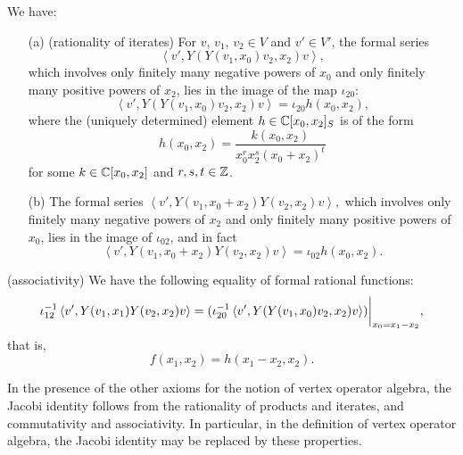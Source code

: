 \documentclass[12pt]{article}
\begin{document}
\begin{propo}\label{rationalityofiterates}
We have:
\begin{enumerate}
\item[(a)] (rationality of iterates) For $v$, $v_{1}$, $v_{2}\in V$
and $v'\in V'$, the formal series
\begin{equation}\label{v'YYv1v2v}
\left\langle v', Y(Y(v_{1}, x_{0})v_{2}, x_{2})v\right\rangle,
\end{equation}
which involves only finitely many negative powers of $x_{0}$ and only
finitely many positive powers of $x_{2}$, lies in the image of the map
$\iota_{20}$:
\begin{equation}
\left\langle v', Y(Y(v_{1}, x_{0})v_{2},
x_{2})v\right\rangle=\iota_{20}h(x_{0}, x_{2}),
\end{equation}
where the (uniquely determined) element $h\in {\mathbb{C}}[x_{0},
x_{2}]_{S}$ is of the form
\begin{equation}
h(x_{0}, x_{2})={\displaystyle \frac{k(x_{0},
x_{2})}{x_{0}^{r}x_{2}^{s}(x_{0}+x_{2})^{t}}}
\end{equation}
for some $k\in {\mathbb{C}}[x_{0}, x_{2}]$ and $r, s, t\in {\mathbb{Z}}$.
\item[(b)] The formal series $\left\langle v', Y(v_{1},
x_{0}+x_{2})Y(v_{2}, x_{2})v\right\rangle,$ which involves only
finitely many negative powers of $x_{2}$ and only finitely many
positive powers of $x_{0}$, lies in the image of $\iota_{02}$, and in
fact
\begin{equation}
\left\langle v', Y(v_{1}, x_{0}+x_{2})Y(v_{2},
x_{2})v\right\rangle=\iota_{02}h(x_{0}, x_{2}).
\end{equation}
\end{enumerate}
\end{propo}

\begin{propo}\label{associativity} 
(associativity) We have the following equality of formal rational
functions:
\begin{equation}
\iota_{12}^{-1}\left\langle v', Y(v_{1}, x_{1})Y(v_{2}, x_{2})v\right\rangle
=(\iota_{20}^{-1}\left\langle v', Y(Y(v_{1}, x_{0})v_{2},
x_{2})v\right\rangle)\bigg\vert_{x_{0}=x_{1}-x_{2}},
\end{equation}
that is,
\[
f(x_1,x_2)=h(x_1-x_2,x_2).
\]
\end{propo}

\begin{propo}\label{commandassocequivtoJacobi} 
In the presence of the other axioms for the notion of vertex operator
algebra, the Jacobi identity follows {from} the rationality of
products and iterates, and commutativity and associativity.  In
particular, in the definition of vertex operator algebra, the Jacobi
identity may be replaced by these properties.
\end{propo}
\end{document}
